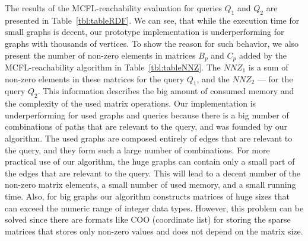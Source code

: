 The results of the MCFL-reachability evaluation for queries $Q_1$ and $Q_2$ are presented in Table~\ref{tbl:tableRDF}. We can see, that while the execution time for small graphs is decent, our prototype implementation is underperforming for graphs with thousands of vertices. To show the reason for such behavior, we also present the number of non-zero elements in matrices $B_p$ and $C_p$ added by the MCFL-reachability algorithm in Table~\ref{tbl:tableNNZ}. The $NNZ_1$ is a sum of non-zero elements in these matrices for the query $Q_1$, and the $NNZ_2$ --- for the query $Q_2$. This information describes the big amount of consumed memory and the complexity of the used matrix operations. Our implementation is underperforming for used graphs and queries because there is a big number of combinations of paths that are relevant to the query, and was founded by our algorithm. The used graphs are composed entirely of edges that are relevant to the query, and they form such a large number of combinations. For more practical use of our algorithm, the huge graphs can contain only a small part of the edges that are relevant to the query. This will lead to a decent number of the non-zero matrix elements, a small number of used memory, and a small running time. Also, for big graphs our algorithm constructs matrices of huge sizes that can exceed the numeric range of integer data types. However, this problem can be solved since there are formats like COO (coordinate list) for storing the sparse matrices that stores only non-zero values and does not depend on the matrix size.


